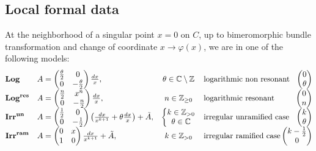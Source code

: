 \documentclass[12]{amsart}
\newcommand{\Log}{\boldsymbol{\mathrm{Log}}}
\newcommand{\Logres}{\boldsymbol{\mathrm{Log}^{\mathrm{res}}}}
\newcommand{\Irrun}{\boldsymbol{\mathrm{Irr}^{\mathrm{un}}}}
\newcommand{\Irram}{\boldsymbol{\mathrm{Irr}^{\mathrm{ram}}}}
\begin{document}
\subsection{Local formal data}
At the neighborhood of a singular point $x=0$ on $C$, 
up to bimeromorphic bundle transformation and change of coordinate $x\to\varphi(x)$, 
we are in one of the following models:
\begin{equation}\label{eq:ModelSing}
\begin{matrix}
\Log\hfill\hfill & A=\begin{pmatrix}\frac{\theta}{2}&0\\ 0&-\frac{\theta}{2}\end{pmatrix}\frac{dx}{x}, \hfill\hfill
& \theta\in\mathbb C\setminus\mathbb Z
& \text{logarithmic non resonant}\hfill\begin{pmatrix}0\\ \theta\end{pmatrix}\\
\Logres & A=\begin{pmatrix}\frac{n}{2}&x^n\\ 0&-\frac{n}{2}\end{pmatrix}\frac{dx}{x}, \hfill\hfill
& n\in\mathbb Z_{\ge0}
& \text{logarithmic resonant}\hfill\begin{pmatrix}0\\ n\end{pmatrix}\\
\Irrun\hfill\hfill & A=\begin{pmatrix}\frac{1}{2}&0\\ 0&-\frac{1}{2}\end{pmatrix}\left(\frac{dx}{x^{k+1}}+\theta\frac{dx}{x}\right)+\tilde A,
& \left\{\begin{matrix} k\in\mathbb Z_{>0}\\ \theta\in\mathbb C\end{matrix}\right.  
& \text{irregular unramified case}\hfill\begin{pmatrix}k\\ \theta\end{pmatrix}\\
\Irram & A=\begin{pmatrix}0&x\\ 1&0\end{pmatrix}\frac{dx}{x^{k+1}}+\tilde A,\hfill\hfill
& k\in\mathbb Z_{>0}  
& \text{irregular ramified case}\begin{pmatrix}k-\frac{1}{2}\\ 0\end{pmatrix}
\end{matrix}
\end{equation}
\end{document}
